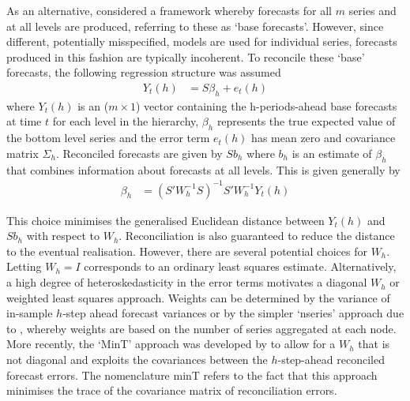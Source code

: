 \documentclass[a4paper,fleqn,11pt]{article}
\begin{document}
As an alternative, \cite{Hyndman2011} considered a framework whereby forecasts for all $m$ series and at all levels are produced, referring to these as `base forecasts'.  However, since different, potentially misspecified, models are used for individual series, forecasts produced in this fashion are typically incoherent. To reconcile these `base' forecasts, \cite{Hyndman2011} the following regression structure was assumed
\begin{align}
Y_t(h) &= S\beta_{h} + e_t(h)
\label{eq:regstruct}
\end{align}
where $Y_t(h)$ is an ($m \times 1$) vector containing the h-periods-ahead base forecasts at time $t$ for each level in the hierarchy, $\beta_{h}$ represents the true expected value of the bottom level series and the error term $e_t(h)$ has mean zero and covariance matrix $\Sigma_h$. Reconciled forecasts are given by $Sb_{h}$ where $b_h$ is an estimate of $\beta_{h}$ that combines information about forecasts at all levels.  This is given generally by
\begin{align}
\label{eq:reg}
\beta_{h} &= \left(S'W_h^{-1}S \right)^{-1} S'W_h^{-1}Y_t(h)
\end{align}

This choice minimises the generalised Euclidean distance between $Y_t(h)$ and $Sb_{h}$ with respect to $W_h$. Reconciliation is also guaranteed to reduce the distance to the eventual realisation.  However, there are several potential choices for $W_h$.  Letting $W_h=I$ corresponds to an ordinary least squares estimate.  Alternatively, a high degree of heteroskedasticity in the error terms motivates a diagonal $W_h$ or weighted least squares approach. Weights can be determined by the variance of in-sample $h$-step ahead forecast variances or by the simpler `nseries' approach due to \cite{Athanasopoulos2017}, whereby weights are based on the number of series aggregated at each node.  More recently, the `MinT' approach was developed by \cite{Wickramasuriya2015} to allow for a $W_h$ that is not diagonal and exploits the covariances between the $h$-step-ahead reconciled forecast errors. The nomenclature minT refers to the fact that this approach minimises the trace of the covariance matrix of reconciliation errors.  
\end{document}

